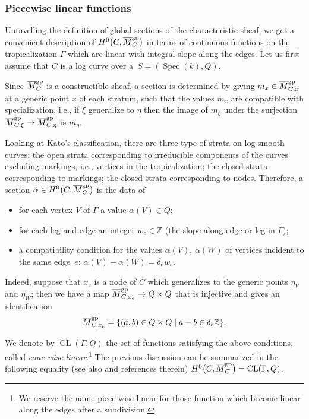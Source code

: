 \subsubsection{Piecewise linear functions}
Unravelling the definition of global sections of the characteristic sheaf, we get a convenient description of $H^0\bigl(C,\overline{M}_C^{\rm gp}\bigr)$ in terms of continuous functions on the tropicalization $\Gamma$ which are linear with integral slope along the edges.
Let us first assume that $C$ is a log curve over a~${S=(\operatorname{Spec}(k),Q)}$.

Since $\overline{M}_C^{\rm gp}$ is a constructible sheaf, a
section is determined by giving $m_x\in\overline{M}_{C,x}^{\rm gp}$ at a generic point $x$ of each stratum,
such that the values $m_x$ are compatible with specialization, i.e., if $\xi$ generalize to $\eta$ then the image of $m_{\xi}$ under the surjection $\overline{M}_{C,\xi}^{\rm gp}\to \overline{M}_{C,\eta}^{\rm gp}$ is $m_{\eta}$.

Looking at Kato's classification, there are three type of strata on log smooth curves: the open strata corresponding to irreducible components of the curves excluding markings, i.e., vertices in the tropicalization; the closed strata corresponding to markings; the closed strata corresponding to nodes. Therefore, a section $\alpha\in H^0\bigl(C,\overline{M}_C^{\rm gp}\bigr)$ is the data of
\begin{itemize}\itemsep=0pt
 \item for each vertex $V$ of $\Gamma$ a value $\alpha(V)\in Q$;
 \item for each leg and edge an integer $w_e\in\mathbb Z$ (the slope along edge or leg in $\Gamma$);
 \item a compatibility condition for the values $\alpha(V)$, $\alpha(W)$ of vertices incident to the same edge~$e$: $\alpha(V)-\alpha(W)=\delta_e w_e$.
\end{itemize}
Indeed, suppose that $x_e$ is a node
of $C$ which generalizes to the generic points $\eta_V$ and $\eta_W$; then we have a map
$\overline{M}_{C,x_e}^{\rm gp}\to Q\times Q$
that is injective and gives an identification
\[\overline{M}_{C,x_e}^{\rm gp}=\{(a,b)\in Q\times Q \mid a-b\in\delta_e\mathbb Z\}.\]

We denote by $\operatorname{CL}(\Gamma,Q)$ the set of functions satisfying the above conditions, called \textit{cone-wise linear}.\footnote{We reserve the name piece-wise linear for those function which become linear along the edges after a subdivision.} The previous discussion can be summarized in the following equality (see also \cite[Section~3.3.3]{marcuswiselog} and references therein)
$H^0\bigl(C,\overline{M}_C^{\rm gp}\bigr)=\operatorname{CL}(\Gamma,Q)$.

